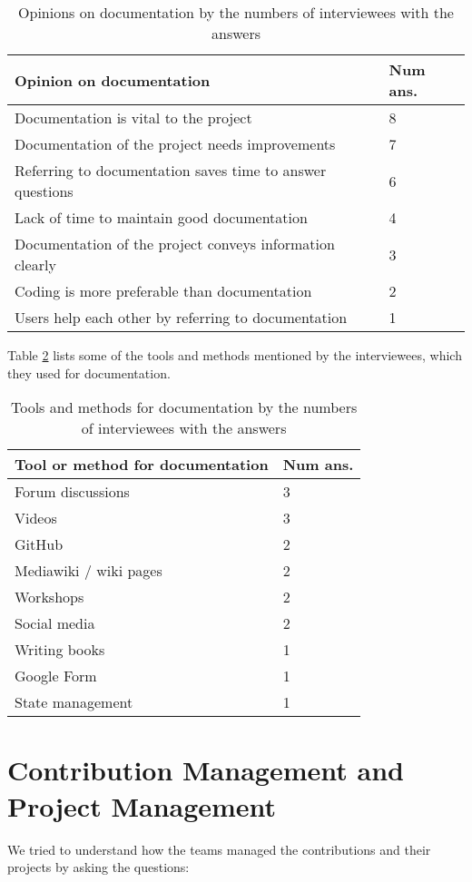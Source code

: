 \begin{table}[H]
\centering
\begin{tabular}{ll}
\hline
Opinion on documentation & Num ans. \\ \hline
Documentation is vital to the project& 8 \\
Documentation of the project needs improvements & 7 \\
Referring to documentation saves time to answer questions & 6 \\
Lack of time to maintain good documentation & 4 \\
Documentation of the project conveys information clearly & 3 \\
Coding is more preferable than documentation & 2 \\
Users help each other by referring to documentation & 1 \\ \hline
\end{tabular}
\caption{\label{tab_opinion_doc}Opinions on documentation by the numbers of interviewees with the answers}
\end{table}

Table \ref{tab_doc_tools} lists some of the tools and methods mentioned by the interviewees, which they used for documentation.

\begin{table}[H]
\centering
\begin{tabular}{ll}
\hline
Tool or method for documentation & Num ans. \\ \hline
Forum discussions & 3 \\
Videos & 3 \\
GitHub & 2 \\
Mediawiki / wiki pages & 2 \\
Workshops & 2 \\
Social media & 2 \\
Writing books & 1 \\
Google Form & 1 \\
State management & 1 \\ \hline
\end{tabular}
\caption{\label{tab_doc_tools}Tools and methods for documentation by the numbers of interviewees with the answers}
\end{table}

\section{Contribution Management and Project Management}
\label{sec_contribution_pm}
We tried to understand how the teams managed the contributions and their projects by asking the questions:

